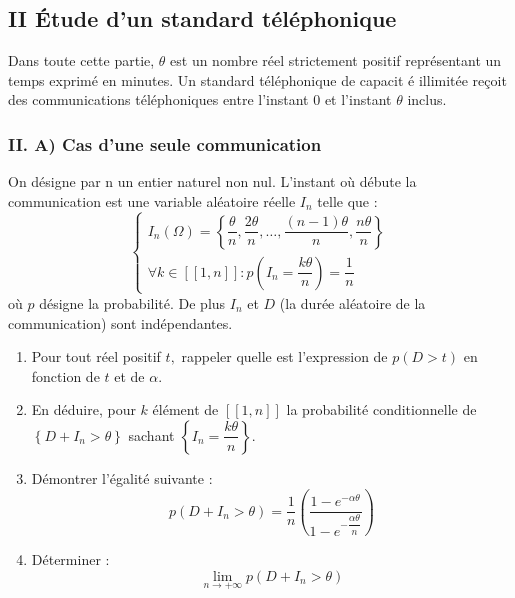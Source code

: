 \documentclass[a4paper, 11pt,reqno]{article}
\begin{document}
\subsection*{II Étude d'un standard téléphonique}

Dans toute cette partie, $\theta $ est un nombre réel strictement positif
représentant un temps exprimé en minutes. Un standard téléphonique de capacit%
é illimitée reçoit des communications téléphoniques entre l'instant 0 et
l'instant $\theta $ inclus.

\subsubsection*{II. A) Cas d'une seule communication}

On désigne par n un entier naturel non nul. L'instant où débute la
communication est une variable aléatoire réelle $I_{n}$ telle que : 
\begin{equation*}
\left\{ 
\begin{array}{c}
I_{n}\left( \Omega \right) =\left\{ \dfrac{\theta }{n},\dfrac{2\theta }{n}%
,\dots ,\dfrac{\left( n-1\right) \theta }{n},\dfrac{n\theta }{n}\right\}  \\ 
\forall k\in \left[ \left[ 1,n\right] \right] :p\left( I_{n}=\dfrac{k\theta 
}{n}\right) =\dfrac{1}{n}%
\end{array}%
\right. 
\end{equation*}%
où $p$ désigne la probabilité. De plus $I_{n}$ et $D$ (la durée aléatoire de
la communication) sont indépendantes.

\begin{enumerate}
\item Pour tout réel positif $t,$ rappeler quelle est l'expression de $%
p\left( D>t\right) $ en fonction de $t$ et de $\alpha $.

\item En déduire, pour $k$ élément de $\left[ \left[ 1,n\right] \right] $ la
probabilité conditionnelle de $\left\{ D+I_{n}>\theta \right\} $ sachant $%
\left\{ I_{n}=\dfrac{k\theta }{n}\right\} .$

\item Démontrer l'égalité suivante : 
\begin{equation*}
p\left( D+I_{n}>\theta \right) =\dfrac{1}{n}\left( \dfrac{1-e^{-\alpha
\theta }}{1-e^{-\dfrac{\alpha \theta }{n}}}\right)
\end{equation*}

\item Déterminer : 
\begin{equation*}
\lim_{n\rightarrow +\infty }p\left( D+I_{n}>\theta \right)
\end{equation*}
\end{enumerate}
\end{document}
